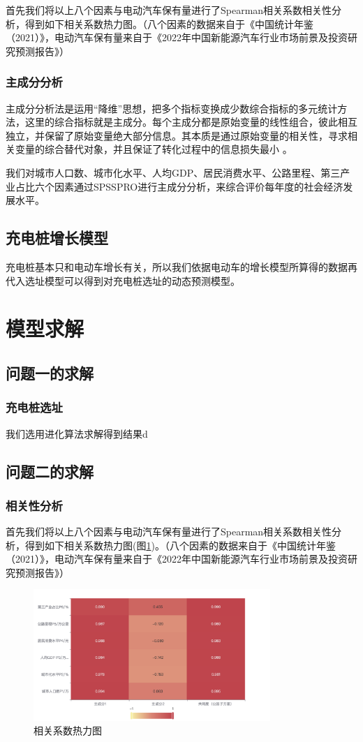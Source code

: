 \documentclass[12pt, a4paper, oneside]{ctexart}
\begin{document}
首先我们将以上八个因素与电动汽车保有量进行了Spearman相关系数相关性分析，得到如下相关系数热力图。（八个因素的数据来自于《中国统计年鉴（2021）》\cite{cite:统计年鉴}，电动汽车保有量来自于《2022年中国新能源汽车行业市场前景及投资研究预测报告》\cite{cite:预测报告}）
\subsubsection{主成分分析}
主成分分析法是运用“降维”思想，把多个指标变换成少数综合指标的多元统计方法，这里的综合指标就是主成分。每个主成分都是原始变量的线性组合，彼此相互独立，并保留了原始变量绝大部分信息。其本质是通过原始变量的相关性，寻求相关变量的综合替代对象，并且保证了转化过程中的信息损失最小 。

我们对城市人口数、城市化水平、人均GDP、居民消费水平、公路里程、第三产业占比六个因素通过SPSSPRO进行主成分分析，来综合评价每年度的社会经济发展水平。

\subsection{充电桩增长模型}
充电桩基本只和电动车增长有关，所以我们依据电动车的增长模型所算得的数据再代入选址模型可以得到对充电桩选址的动态预测模型。
\section{模型求解}
\subsection{问题一的求解}
\subsubsection{充电桩选址}
我们选用进化算法求解得到结果d
\subsection{问题二的求解}
\subsubsection{相关性分析}
首先我们将以上八个因素与电动汽车保有量进行了Spearman相关系数相关性分析，得到如下相关系数热力图(图\ref{fig:相关系数热力图})。（八个因素的数据来自于《中国统计年鉴（2021）》\cite{cite:统计年鉴}，电动汽车保有量来自于《2022年中国新能源汽车行业市场前景及投资研究预测报告》\cite{cite:预测报告}）
\begin{figure}[h]
    \centering
    \includegraphics[width=0.8\textwidth]{pic/相关系数热力图.png}
    \caption{相关系数热力图}
    \label{fig:相关系数热力图}
\end{figure}
\end{document}
